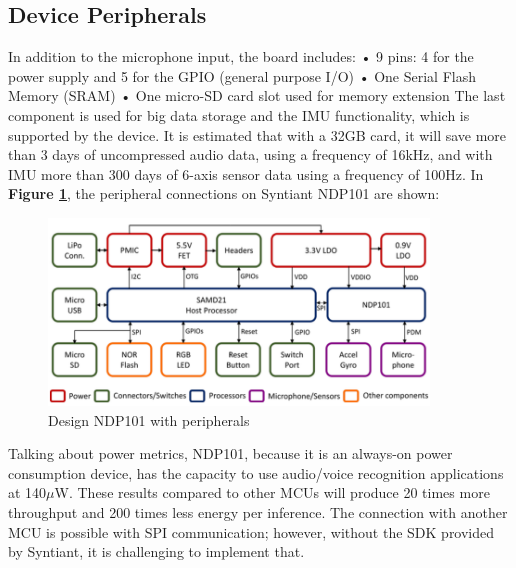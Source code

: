\subsection{Device Peripherals}
In addition to the microphone input, the board includes:\newline
• 9 pins: 4 for the power supply and 5 for the GPIO (general purpose I/O)\newline
• One Serial Flash Memory (SRAM)\newline
• One micro-SD card slot used for memory extension\newline
The last component is used for big data storage and the IMU functionality, which is supported by the device. It is estimated that with a 32GB card, it will save more than 3 days of uncompressed audio data, using a frequency of 16kHz, and with IMU more than 300 days of 6-axis sensor data using a frequency of 100Hz\cite{analysis_syntiant_performances}. In \textbf{Figure \ref{fig:design NDP101}}, the peripheral connections on Syntiant NDP101 are shown:\newline
\begin{figure}[!h]
    \centering
        \includegraphics[width=0.9\textwidth]{images/2.02 Design with peripherals.png}
        \caption{Design NDP101 with peripherals \cite{analysis_syntiant_performances}}
        \label{fig:design NDP101}
\end{figure}
\newline Talking about power metrics, NDP101, because it is an always-on power consumption device, has the capacity to use audio/voice recognition applications at 140$\mu$W. These results compared to other MCUs will produce 20 times more throughput and 200 times less energy per inference\cite{analysis_syntiant_performances}. The connection with another MCU is possible with SPI communication; however, without the SDK provided by Syntiant, it is challenging to implement that.

